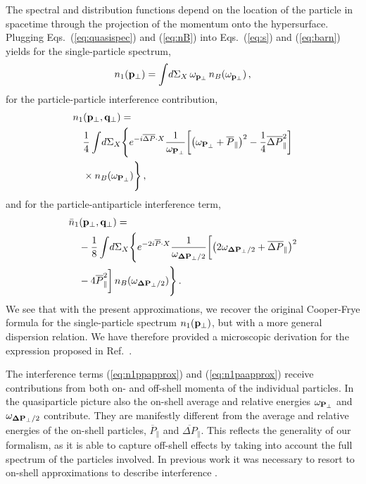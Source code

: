 \documentclass[reprint,superscriptaddress,english,preprintnumbers,amsmath,amssymb,aps,prx]{revtex4-2}
\def\eq#1{(\ref{#1})}
\begin{document}
The spectral and distribution functions depend on the location of the particle in spacetime through the projection of the momentum onto the hypersurface.
Plugging Eqs.\ \eq{eq:quasispec} and \eq{eq:nB} into Eqs.\ \eq{eq:s} and \eq{eq:barn} yields for the single-particle spectrum,
\begin{align}\label{eq:n1approx}
\begin{split}
n_1(\bold{p}_\perp) =\int\!d\Sigma_X\,\omega_{\bold{p}_\perp}\,n_B(\omega_{\bold{p}_\perp})\,,
\end{split}
\end{align}
for the particle-particle interference contribution,
\begin{align}\label{eq:n1ppapprox}
\begin{split}
&n_1(\bold{p}_\perp,\bold{q}_\perp)=\\
&\quad \frac{1}{4}\int\!d\Sigma_X\Bigg\{ e^{-i\overline{\Delta P}\cdot X} \frac{1}{\omega_{\bold{P}_\perp}}
\bigg[ 
\big( \omega_{\bold{P}_\perp}+ \overline{P}_\parallel \big)^2 - \frac{1}{4} \overline{\Delta P}_\parallel^2
 \bigg]\\
 &\quad\times n_B(\omega_{\bold{P}_\perp})\Bigg\}\,,
\end{split}
\end{align}
and for the particle-antiparticle interference term,
\begin{align}\label{eq:n1paapprox}
\begin{split}
&\bar n_1(\bold{p}_\perp,\bold{q}_\perp) =\\
&\quad-\frac{1}{8}\int\!d\Sigma_X\Bigg\{ e^{-2i\overline{P} \cdot X}\frac{1}{\omega_{\bold{\Delta P}_\perp/2}}\bigg[\big(2\omega_{\bold{\Delta P}_\perp/2} + \overline{\Delta P}_\parallel  \big)^2\\
&\quad- 4 \overline{P}_\parallel^2 \bigg]\, n_B(\omega_{\bold{\Delta P}_\perp/2})\Bigg\}\,.
\end{split}
\end{align}
We see that with the present approximations, we recover the original Cooper-Frye formula for the single-particle spectrum $n_1(\bold{p}_\perp)$, but with a more general dispersion relation. We have therefore provided a microscopic derivation for the expression proposed in Ref.\ \cite{Pisarski:2021qof}.

The interference terms (\ref{eq:n1ppapprox}) and (\ref{eq:n1paapprox}) receive contributions from both on- and off-shell momenta of the individual particles. In the quasiparticle picture also the on-shell average and relative energies $\omega_{\bold{P}_\perp}$ and $\omega_{\bold{\Delta P}_\perp/2}$ contribute. They are manifestly different from the average and relative energies of the on-shell particles, $\overline{P}_\parallel$ and $\overline{\Delta P}_\parallel$. This reflects the generality of our formalism, as it is able to capture off-shell effects by taking into account the full spectrum of the particles involved. In previous work it was necessary to resort to on-shell approximations to describe interference \cite{Heinz:1996bs}.
\end{document}

